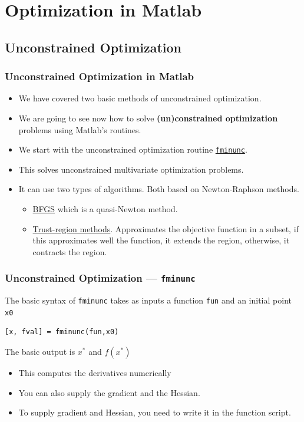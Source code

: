 \documentclass[11pt,xcolor={svgnames},aspectratio=169,usepdftitle=false]{beamer}
\begin{document}
\section{Optimization in Matlab}

\subsection{Unconstrained Optimization}

\begin{frame}
  \frametitle{Unconstrained Optimization in Matlab}
\begin{itemize}
  \item We have covered two basic methods of unconstrained optimization.
  \item We are going to see now how to solve \alert{\textbf{(un)constrained optimization}} problems using Matlab's routines.
  \item We start with the unconstrained optimization routine \href{https://www.mathworks.com/help/optim/ug/fminunc.html}{\texttt{fminunc}}.
  \item This solves unconstrained multivariate optimization problems.
  \item It can use two types of algorithms. Both based on Newton-Raphson methods.
  \begin{itemize}
    \item \href{https://en.wikipedia.org/wiki/Broyden-Fletcher-Goldfarb-Shanno_algorithm}{BFGS} which is a quasi-Newton method.
    \item \href{https://www.mathworks.com/help/optim/ug/unconstrained-nonlinear-optimization-algorithms.html\#brnpcy5}{Trust-region methods}. Approximates the objective function in a subset, if this approximates well the function, it extends the region, otherwise, it contracts the region.
  \end{itemize}
\end{itemize}
\end{frame}

\begin{frame}[fragile]
  \frametitle{Unconstrained Optimization --- \texttt{fminunc}}
The basic syntax of \verb;fminunc; takes as inputs a function \verb;fun; and an initial point \verb;x0; 
\begin{lstlisting}
[x, fval] = fminunc(fun,x0)
\end{lstlisting}
The basic output is $x^*$ and $f(x^*)$

\begin{itemize}
  \item This computes the derivatives numerically
  \item You can also supply the gradient and the Hessian.
  \item To supply gradient and Hessian, you need to write it in the function script.
\end{itemize}
\end{frame}
\end{document}

